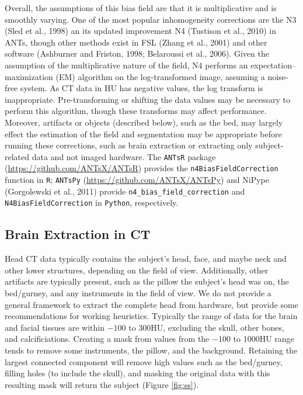 \documentclass[utf8]{frontiersSCNS}
\begin{document}
Overall, the assumptions of this bias field are that it is multiplicative and is smoothly varying. One of the most popular inhomogeneity corrections are the N3 (Sled et al., 1998) an its updated improvement N4 (Tustison et al., 2010) in ANTs, though other methods exist in FSL (Zhang et al., 2001) and other software (Ashburner and Friston, 1998; Belaroussi et al., 2006). Given the assumption of the multiplicative nature of the field, N4 performs an expectation--maximization (EM) algorithm on the log-transformed image, assuming a noise-free system. As CT data in HU has negative values, the log transform is inappropriate. Pre-transforming or shifting the data values may be necessary to perform this algorithm, though these transforms may affect performance. Moreover, artifacts or objects (described below), such as the bed, may largely effect the estimation of the field and segmentation may be appropriate before running these corrections, such as brain extraction or extracting only subject-related data and not imaged hardware. The \texttt{ANTsR} package (\url{https://github.com/ANTsX/ANTsR}) provides the \texttt{n4BiasFieldCorrection} function in \texttt{R}; \texttt{ANTsPy} (\url{https://github.com/ANTsX/ANTsPy}) and NiPype (Gorgolewski et al., 2011) provide \texttt{n4\_bias\_field\_correction} and \texttt{N4BiasFieldCorrection} in \texttt{Python}, respectively.

\hypertarget{brain-extraction-in-ct}{%
\subsection{Brain Extraction in CT}\label{brain-extraction-in-ct}}

Head CT data typically contains the subject's head, face, and maybe neck and other lower structures, depending on the field of view. Additionally, other artifacts are typically present, such as the pillow the subject's head was on, the bed/gurney, and any instruments in the field of view. We do not provide a general framework to extract the complete head from hardware, but provide some recommendations for working heuristics. Typically the range of data for the brain and facial tissues are within \(-100\) to \(300\)HU, excluding the skull, other bones, and calcificiations. Creating a mask from values from the \(-100\) to \(1000\)HU range tends to remove some instruments, the pillow, and the background. Retaining the largest connected component will remove high values such as the bed/gurney, filling holes (to include the skull), and masking the original data with this resulting mask will return the subject (Figure \ref{fig:ss}).
\end{document}
